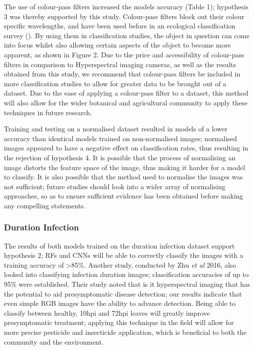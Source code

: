 \documentclass[../../Paper.tex]{subfiles}
\begin{document}
The use of colour-pass filters increased the models accuracy (Table 1); hypothesis 3 was thereby supported by this study. Colour-pass filters block out their colour specific wavelengths, and have been used before in an ecological classification survey (\cite{knoth_unmanned_2013}). By using them in classification studies, the object in question can come into focus whilst also allowing certain aspects of the object to become more apparent, as shown in Figure 2. Due to the price and accessibility of colour-pass filters in comparison to Hyperspectral imaging cameras, as well as the results obtained from this study, we recommend that colour-pass filters be included in more classification studies to allow for greater data to be brought out of a dataset. Due to the ease of applying a colour-pass filter to a dataset, this method will also allow for the wider botanical and agricultural community to apply these techniques in future research. 

Training and testing on a normalised dataset resulted in models of a lower accuracy than identical models trained on non-normalised images; normalised images appeared to have a negative effect on classification rates, thus resulting in the rejection of hypothesis 4. It is possible that the process of normalising an image distorts the feature space of the image, thus making it harder for a model to classify. It is also possible that the method used to normalise the images was not sufficient; future studies should look into a wider array of normalising approaches, so as to ensure sufficient evidence has been obtained before making any compelling statements. 


\subsubsection*{Duration Infection}

The results of both models trained on the duration infection dataset support hypothesis 2;  RFs and CNNs will be able to correctly classify the images with a training accuracy of \textgreater 85\%. Another study, conducted by Zhu \textit{et al} 2016, also looked into classifying infection duration images; classification accuracies of up to 95\% were established. Their study noted that is it hyperspectral imaging that has the potential to aid presymptomatic disease detection; our results indicate that even simple RGB images have the ability to advance detection. Being able to classify between healthy, 10hpi and 72hpi leaves will greatly improve presymptomatic treatment; applying this technique in the field will allow for more precise pesticide and insecticide application, which is beneficial to both the community and the environment.
\end{document}
